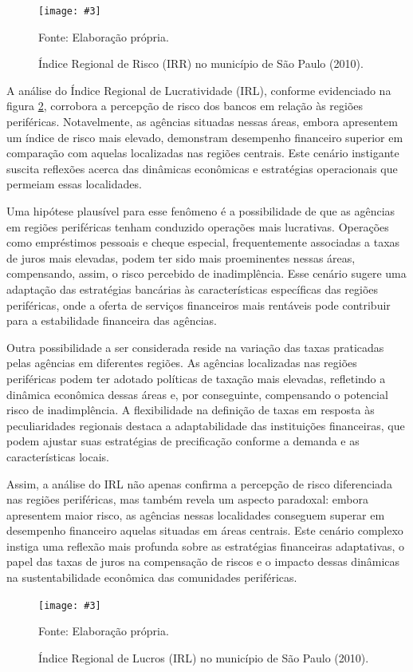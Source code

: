 \documentclass[a4paper,12pt]{article}
\newcommand{\fig}[4]{%
  \begin{figure}[H]
    \centering
    \caption{#1}
    \label{#2}
    \texttt{[image: \#3]}
    
    \vspace{0.5cm}
    
    \begin{footnotesize}
      Fonte: #4
    \end{footnotesize}
  \end{figure}
}
\begin{document}
\fig{Índice Regional de Risco (IRR) no município de São Paulo (2010).}{fig:irr}{exports/irr2.pdf}{Elaboração própria.}

A análise do Índice Regional de Lucratividade (IRL), conforme
evidenciado na figura \ref{fig:irl}, corrobora a percepção de risco dos
bancos em relação às regiões periféricas. Notavelmente, as agências
situadas nessas áreas, embora apresentem um índice de risco mais
elevado, demonstram desempenho financeiro superior em comparação com
aquelas localizadas nas regiões centrais. Este cenário instigante
suscita reflexões acerca das dinâmicas econômicas e estratégias
operacionais que permeiam essas localidades.

Uma hipótese plausível para esse fenômeno é a possibilidade de que as
agências em regiões periféricas tenham conduzido operações mais
lucrativas. Operações como empréstimos pessoais e cheque especial,
frequentemente associadas a taxas de juros mais elevadas, podem ter sido
mais proeminentes nessas áreas, compensando, assim, o risco percebido de
inadimplência. Esse cenário sugere uma adaptação das estratégias
bancárias às características específicas das regiões periféricas, onde a
oferta de serviços financeiros mais rentáveis pode contribuir para a
estabilidade financeira das agências.

Outra possibilidade a ser considerada reside na variação das taxas
praticadas pelas agências em diferentes regiões. As agências localizadas
nas regiões periféricas podem ter adotado políticas de taxação mais
elevadas, refletindo a dinâmica econômica dessas áreas e, por
conseguinte, compensando o potencial risco de inadimplência. A
flexibilidade na definição de taxas em resposta às peculiaridades
regionais destaca a adaptabilidade das instituições financeiras, que
podem ajustar suas estratégias de precificação conforme a demanda e as
características locais.

Assim, a análise do IRL não apenas confirma a percepção de risco
diferenciada nas regiões periféricas, mas também revela um aspecto
paradoxal: embora apresentem maior risco, as agências nessas localidades
conseguem superar em desempenho financeiro aquelas situadas em áreas
centrais. Este cenário complexo instiga uma reflexão mais profunda sobre
as estratégias financeiras adaptativas, o papel das taxas de juros na
compensação de riscos e o impacto dessas dinâmicas na sustentabilidade
econômica das comunidades periféricas.

\fig{Índice Regional de Lucros (IRL) no município de São Paulo (2010).}{fig:irl}{exports/irl2.pdf}{Elaboração própria.}
\end{document}
